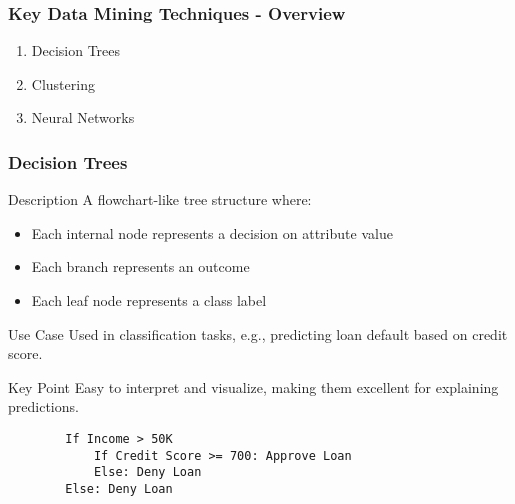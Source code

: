 \documentclass[aspectratio=169]{beamer}
\begin{document}
\begin{frame}[fragile]
    \frametitle{Key Data Mining Techniques - Overview}

    \begin{enumerate}
        \item Decision Trees
        \item Clustering
        \item Neural Networks
    \end{enumerate}

\end{frame}

\begin{frame}[fragile]
    \frametitle{Decision Trees}
    
    \begin{block}{Description}
        A flowchart-like tree structure where:
        \begin{itemize}
            \item Each internal node represents a decision on attribute value
            \item Each branch represents an outcome
            \item Each leaf node represents a class label
        \end{itemize}
    \end{block}
    
    \begin{block}{Use Case}
        Used in classification tasks, e.g., predicting loan default based on credit score.
    \end{block}
    
    \begin{block}{Key Point}
        Easy to interpret and visualize, making them excellent for explaining predictions.
    \end{block}
    
    \begin{example}
        \begin{lstlisting}
        If Income > 50K
            If Credit Score >= 700: Approve Loan
            Else: Deny Loan
        Else: Deny Loan
        \end{lstlisting}
    \end{example}

\end{frame}
\end{document}
